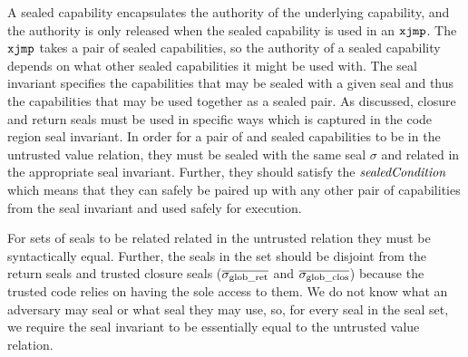 \begin{jversion}
A sealed capability encapsulates the authority of the underlying capability, and the authority is only released when the sealed capability is used in an $\txjmp{}{}$.
The $\xjmp{}{}$ takes a pair of sealed capabilities, so the authority of a sealed capability depends on what other sealed capabilities it might be used with.
The seal invariant specifies the capabilities that may be sealed with a given seal and thus the capabilities that may be used together as a sealed pair.
As discussed, closure and return seals must be used in specific ways which is captured in the code region seal invariant.
In order for a pair of \srccm{} and \trgcm{} sealed capabilities to be in the untrusted value relation, they must be sealed with the same seal $\sigma$ and related in the appropriate seal invariant.
Further, they should satisfy the $\sealedCond[]{}$ which means that they can safely be paired up with any other pair of capabilities from the seal invariant and used safely for execution.

For sets of seals to be related related in the untrusted relation they must be syntactically equal.
Further, the seals in the set should be disjoint from the return seals and trusted closure seals ($\overline{\sigma_{\mathrm{glob\_ret}}}$ and $\overline{\sigma_{\mathrm{glob\_clos}}}$) because the trusted code relies on having the sole access to them.
We do not know what an adversary may seal or what seal they may use, so, for every seal in the seal set, we require the seal invariant to be essentially equal to the untrusted value relation.


\end{jversion}
